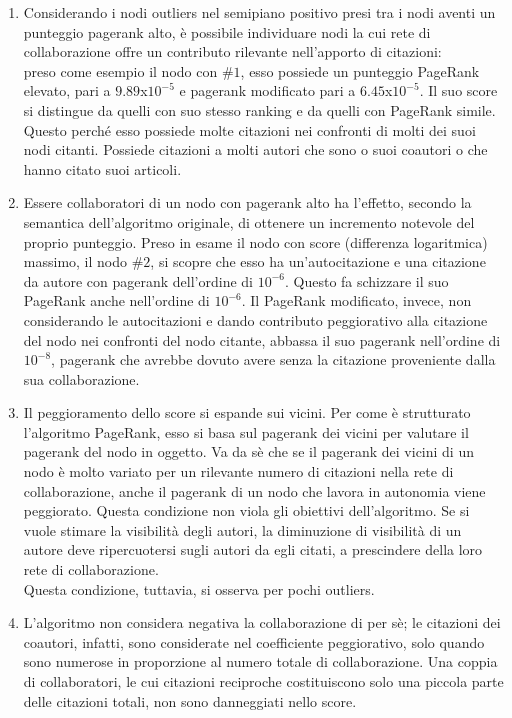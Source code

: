\documentclass[a4paper, 12pt]{article}
\begin{document}
\begin{enumerate}
  \item Considerando i nodi outliers nel semipiano positivo presi tra i nodi aventi un punteggio pagerank alto, è possibile individuare nodi la cui rete di collaborazione offre un contributo rilevante nell'apporto di citazioni: \\
  preso come esempio il nodo con $\#1$, esso possiede un punteggio PageRank elevato, pari a $9.89$x$10^{-5}$ e pagerank modificato pari a $6.45$x$10^{-5}$. Il suo score si distingue da quelli con suo stesso ranking e da quelli con PageRank simile. Questo perché esso possiede molte citazioni nei confronti di molti dei suoi nodi citanti. Possiede citazioni a molti autori che sono o suoi coautori o che hanno citato suoi articoli.
  \item Essere collaboratori di un nodo con pagerank alto ha l'effetto, secondo la semantica dell'algoritmo originale, di ottenere un incremento notevole del proprio punteggio.
  Preso in esame il nodo con score (differenza logaritmica) massimo, il nodo $\#2$, si scopre che esso ha un'autocitazione e una citazione da autore con pagerank dell'ordine di $10^{-6}$. Questo fa schizzare il suo PageRank anche nell'ordine di $10^{-6}$. Il PageRank modificato, invece, non considerando le autocitazioni e dando contributo peggiorativo alla citazione del nodo nei confronti del nodo citante, abbassa il suo pagerank nell'ordine di $10^{-8}$, pagerank che avrebbe dovuto avere senza la citazione proveniente dalla sua collaborazione.
  \item Il peggioramento dello score si espande sui vicini. Per come è strutturato l'algoritmo PageRank, esso si basa sul pagerank dei vicini per valutare il pagerank del nodo in oggetto. Va da sè che se il pagerank dei vicini di un nodo è molto variato per un rilevante numero di citazioni nella rete di collaborazione, anche il pagerank di un nodo che lavora in autonomia viene peggiorato. Questa condizione non viola gli obiettivi dell'algoritmo. Se si vuole stimare la visibilità degli autori, la diminuzione di visibilità di un autore deve ripercuotersi sugli autori da egli citati, a prescindere della loro rete di collaborazione. \\
  Questa condizione, tuttavia, si osserva per pochi outliers.
  \item L'algoritmo non considera negativa la collaborazione di per sè; le citazioni dei coautori, infatti, sono considerate nel coefficiente peggiorativo, solo quando sono numerose in proporzione al numero totale di collaborazione. Una coppia di collaboratori, le cui citazioni reciproche costituiscono solo una piccola parte delle citazioni totali, non sono danneggiati nello score.
\end{enumerate}
\end{document}
